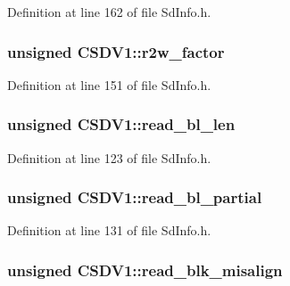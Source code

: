 Definition at line 162 of file Sd\+Info.\+h.

\subsubsection[{\texorpdfstring{r2w\+\_\+factor}{r2w\_factor}}]{\setlength{\rightskip}{0pt plus 5cm}unsigned C\+S\+D\+V1\+::r2w\+\_\+factor}\hypertarget{struct_c_s_d_v1_a477e3d269e084c6ee559237aefcee729}{}\label{struct_c_s_d_v1_a477e3d269e084c6ee559237aefcee729}


Definition at line 151 of file Sd\+Info.\+h.

\subsubsection[{\texorpdfstring{read\+\_\+bl\+\_\+len}{read\_bl\_len}}]{\setlength{\rightskip}{0pt plus 5cm}unsigned C\+S\+D\+V1\+::read\+\_\+bl\+\_\+len}\hypertarget{struct_c_s_d_v1_ac814673bd138c6e3cffc9cd1f1d89d7c}{}\label{struct_c_s_d_v1_ac814673bd138c6e3cffc9cd1f1d89d7c}


Definition at line 123 of file Sd\+Info.\+h.

\subsubsection[{\texorpdfstring{read\+\_\+bl\+\_\+partial}{read\_bl\_partial}}]{\setlength{\rightskip}{0pt plus 5cm}unsigned C\+S\+D\+V1\+::read\+\_\+bl\+\_\+partial}\hypertarget{struct_c_s_d_v1_ab0943077d01c440bb15aff025a700197}{}\label{struct_c_s_d_v1_ab0943077d01c440bb15aff025a700197}


Definition at line 131 of file Sd\+Info.\+h.

\subsubsection[{\texorpdfstring{read\+\_\+blk\+\_\+misalign}{read\_blk\_misalign}}]{\setlength{\rightskip}{0pt plus 5cm}unsigned C\+S\+D\+V1\+::read\+\_\+blk\+\_\+misalign}\hypertarget{struct_c_s_d_v1_aa5f31d46dc26c164663fb16acf1dea34}{}\label{struct_c_s_d_v1_aa5f31d46dc26c164663fb16acf1dea34}


